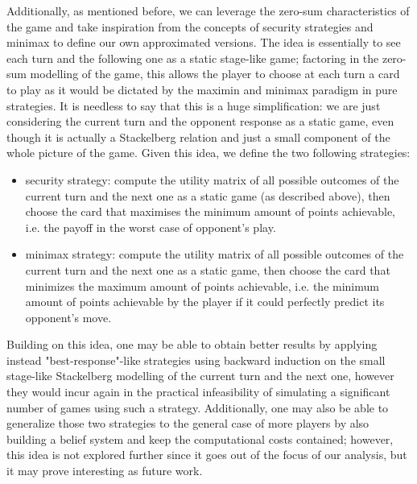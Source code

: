 Additionally, as mentioned before, we can leverage the zero-sum characteristics of the game and take inspiration from the concepts of security strategies and minimax to define our own approximated versions.
The idea is essentially to see each turn and the following one as a static stage-like game; factoring in the zero-sum modelling of the game, this allows the player to choose at each turn a card to play as it would be dictated by the maximin and minimax paradigm in pure strategies. It is needless to say that this is a huge simplification: we are just considering the current turn and the opponent response as a static game, even though it is actually a Stackelberg relation and just a small component of the whole picture of the game.
Given this idea, we define the two following strategies:
\begin{itemize}
	\item security strategy: compute the utility matrix of all possible outcomes of the current turn and the next one as a static game (as described above), then choose the card that maximises the minimum amount of points achievable, i.e. the payoff in the worst case of opponent's play.
	\item minimax strategy: compute the utility matrix of all possible outcomes of the current turn and the next one as a static game, then choose the card that minimizes the maximum amount of points achievable, i.e. the minimum amount of points achievable by the player if it could perfectly predict its opponent's move. 
\end{itemize}

Building on this idea, one may be able to obtain better results by applying instead "best-response"-like strategies using backward induction on the small stage-like Stackelberg modelling of the current turn and the next one, however they would incur again in the practical infeasibility of simulating a significant number of games using such a strategy. Additionally, one may also be able to generalize those two strategies to the general case of more players by also building a belief system and keep the computational costs contained; however, this idea is not explored further since it goes out of the focus of our analysis, but it may prove interesting as future work.